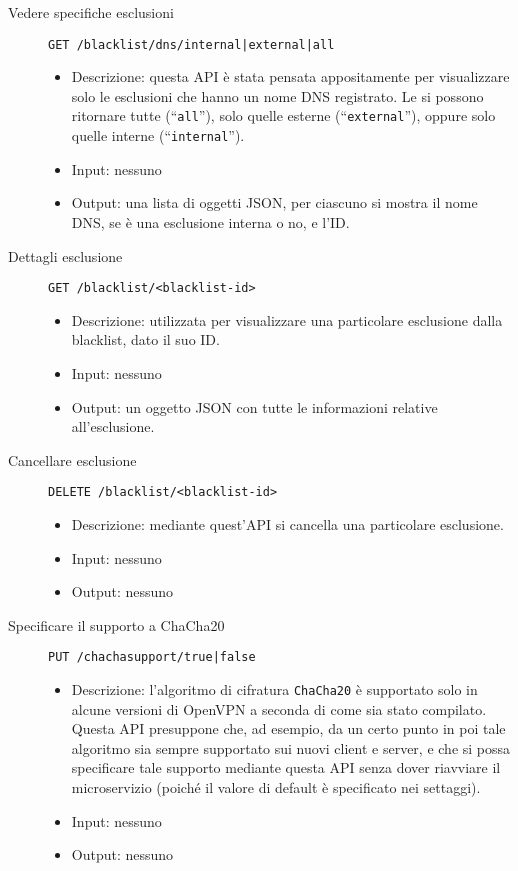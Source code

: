 \begin{description}
    \item[Vedere specifiche esclusioni]\texttt{GET /blacklist/dns/internal|external|all}
    \begin{itemize}
        \item Descrizione: questa API è stata pensata appositamente per visualizzare solo
        le esclusioni che hanno un nome DNS registrato. Le si possono ritornare
        tutte (``\texttt{all}''), solo quelle esterne (``\texttt{external}''),
        oppure solo quelle interne (``\texttt{internal}'').
        \item Input: nessuno
        \item Output: una lista di oggetti JSON, per ciascuno si mostra il nome DNS,
        se è una esclusione interna o no, e l'ID.
    \end{itemize}

    \item[Dettagli esclusione]\texttt{GET /blacklist/<blacklist-id>}
    \begin{itemize}
        \item Descrizione: utilizzata per visualizzare
        una particolare esclusione dalla blacklist, dato il suo ID.
        \item Input: nessuno
        \item Output: un oggetto JSON con tutte le informazioni relative all'esclusione.
    \end{itemize}

    \item[Cancellare esclusione]\texttt{DELETE /blacklist/<blacklist-id>}
    \begin{itemize}
        \item Descrizione: mediante quest'API si cancella una particolare esclusione. 
        \item Input: nessuno
        \item Output: nessuno
    \end{itemize}

    \item[Specificare il supporto a ChaCha20]\texttt{PUT /chachasupport/true|false}
    \begin{itemize}
        \item Descrizione: l'algoritmo di cifratura \texttt{ChaCha20} è
        supportato solo in alcune versioni di OpenVPN a seconda di come sia stato compilato.
        Questa API presuppone che, ad esempio, da un certo punto in poi tale algoritmo sia
        sempre supportato sui nuovi client e server, e che si possa specificare tale
        supporto mediante questa API senza dover riavviare il microservizio (poiché
        il valore di default è specificato nei settaggi).
        \item Input: nessuno
        \item Output: nessuno
    \end{itemize}


\end{description}
